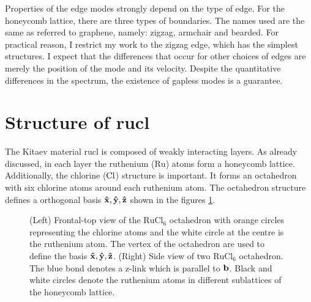 Properties of the edge modes strongly depend on the type of edge. For the honeycomb lattice, there are three types of boundaries. The names used are the same as referred to graphene, namely: zigzag, armchair and bearded. For practical reason, I restrict my work to the zigzag edge, which has the simplest structures. I expect that the differences that occur for other choices of edges are merely the position of the mode and its velocity. Despite the quantitative differences in the spectrum, the existence of gapless modes is a guarantee. 




\section{Structure of \acrshort{rucl}}

The Kitaev material \acrshort{rucl} is composed of weakly interacting layers. As already discussed, in each layer the ruthenium ($\mathrm{Ru}$) atoms form a honeycomb lattice. Additionally, the chlorine ($\rm{Cl}$) structure is important. It forms an octahedron with six chlorine atoms around each ruthenium atom. The octahedron structure defines a orthogonal basis $\bf{\hat{x}},\bf{\hat{y}},\bf{\hat{z}}$ shown in the figures \ref{fig:3-rucl6}.

\begin{figure}[h]
  \begin{minipage}{.4\textwidth}
    \centering  
    \scalebox{1.1}{} 
 \end{minipage}%
 \begin{minipage}{.1\textwidth}
 \end{minipage}%
 \begin{minipage}{.5\textwidth}
\centering
   \scalebox{.6}{} 
  \end{minipage}
  \caption{(Left) Frontal-top view of the $\text{RuCl}_6$ octahedron with orange circles representing the chlorine atoms and the white circle at the centre is the ruthenium atom. The vertex of the octahedron are used to define the basis $\bf{\hat{x}},\bf{\hat{y}},\bf{\hat{z}}$. (Right)
  Side view of two $\text{RuCl}_6$ octahedron. The blue bond denotes a z-link which is parallel to $\bf{b}$. Black and white circles denote the ruthenium atoms in different sublattices of the honeycomb lattice. %
  }  \label{fig:3-rucl6}
  \end{figure}
  
